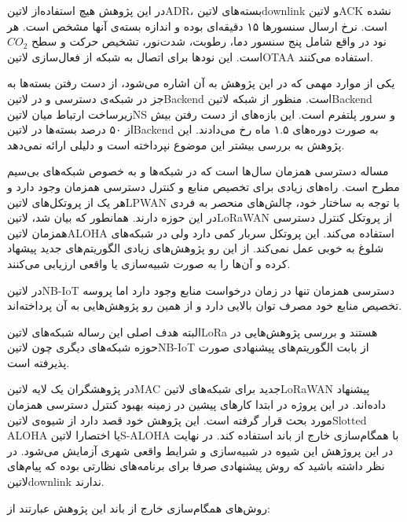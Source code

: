 در این پژوهش هیچ استفاده‌از ‌لاتین{ADR}، بسته‌های ‌لاتین{downlink} و ‌لاتین{ACK} نشده است. نرخ ارسال سنسورها ۱۵ دقیقه‌ای بوده و اندازه بسته‌ی آنها مشخص است.
هر نود در واقع شامل پنج سنسور دما، رطوبت، شدت‌نور، تشخیص حرکت و سطح $CO_{2}$ است. این نودها برای اتصال به شبکه از فعال‌سازی ‌لاتین{OTAA} استفاده می‌کنند.

یکی از موارد مهمی که در این پژوهش به آن اشاره می‌شود، از دست رفتن بسته‌ها به جز در شبکه‌ی دسترسی و در ‌لاتین{Backend} است.
منظور از شبکه ‌لاتین{Backend} زیرساخت ارتباط میان ‌لاتین{NS} و سرور پلتفرم است.
این بازه‌های از دست رفتن بیش از ۵۰ درصد بسته‌ها در ‌لاتین{Backend} به صورت دوره‌های ۱.۵ ماه رخ می‌دادند. این پژوهش به بررسی بیشتر این موضوع نپرداخته است و دلیلی ارائه نمی‌دهد.


مساله دسترسی همزمان سال‌ها است که در شبکه‌ها و به خصوص شبکه‌های بی‌سیم مطرح است. راه‌های زیادی برای تخصیص منابع و کنترل دسترسی همزمان وجود دارد
و هر یک از پروتکل‌های ‌لاتین{LPWAN} با توجه به ساختار خود، چالش‌های منحصر به فردی در این حوزه دارند.
همانطور که بیان شد، ‌لاتین{LoRaWAN} از پروتکل کنترل دسترسی همزمان ‌لاتین{ALOHA} استفاده می‌کند. این پروتکل سربار کمی دارد ولی در شبکه‌های شلوغ به خوبی عمل نمی‌کند.
از این رو پژوهش‌های زیادی الگوریتم‌های جدید پیشهاد کرده و آن‌ها را به صورت شبیه‌سازی یا واقعی ارزیابی می‌کنند.

در ‌لاتین{NB-IoT} دسترسی همزمان تنها در زمان درخواست منابع وجود دارد
اما پروسه تخصیص منابع خود مصرف توان بالایی دارد و از همین رو پژوهش‌هایی به آن پرداخته‌اند.

البته هدف اصلی این رساله شبکه‌های ‌لاتین{LoRa} هستند و بررسی پژوهش‌هایی در حوزه شبکه‌های دیگری چون ‌لاتین{NB-IoT} از بابت الگوریتم‌های پیشنهادی صورت پذیرفته است.


در  پژوهشگران یک لایه ‌لاتین{MAC} جدید برای شبکه‌های ‌لاتین{LoRaWAN} پیشنهاد داده‌اند. در این پروژه در ابتدا کارهای پیشین در زمینه بهبود کنترل دسترسی همزمان
مورد بحث قرار گرفته است. این پژوهش خود قصد دارد از شیوه‌ی ‌لاتین{Slotted ALOHA} یا اختصارا ‌لاتین{S-ALOHA} با همگام‌سازی خارج از باند استفاده کند.
در نهایت در این پروژهش این شیوه در شبیه‌سازی و شرایط واقعی شهری آزمایش می‌شود. در نظر داشته باشید که روش پیشنهادی صرفا برای برنامه‌های نظارتی بوده که پیام‌های ‌لاتین{downlink} ندارند.

روش‌های همگام‌سازی خارج از باند این پژوهش عبارتند از:

